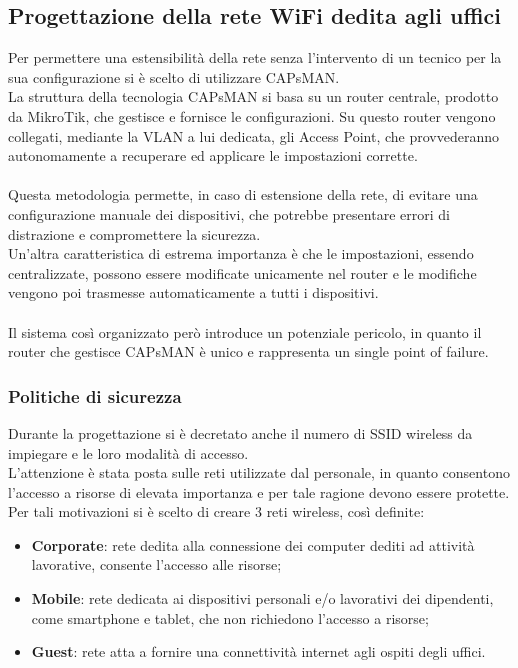 \documentclass[Realizzazione.tex]{subfiles}
\begin{document}
\subsection{Progettazione della rete WiFi dedita agli uffici}
Per permettere una estensibilità della rete senza l'intervento di un tecnico per la sua configurazione si è scelto di utilizzare CAPsMAN. \\
La struttura della tecnologia CAPsMAN si basa su un router centrale, prodotto da MikroTik, che gestisce e fornisce le configurazioni. Su questo router vengono collegati, mediante la VLAN a lui dedicata, gli Access Point, che provvederanno autonomamente a recuperare ed applicare le impostazioni corrette. \\\\
Questa metodologia permette, in caso di estensione della rete, di evitare una configurazione manuale dei dispositivi, che potrebbe presentare errori di distrazione e compromettere la sicurezza. \\
Un'altra caratteristica di estrema importanza è che le impostazioni, essendo centralizzate, possono essere modificate unicamente nel router e le modifiche vengono poi trasmesse automaticamente a tutti i dispositivi. \\\\
Il sistema così organizzato però introduce un potenziale pericolo, in quanto il router che gestisce CAPsMAN è unico e rappresenta un single point of failure.

\newpage
\subsubsection{Politiche di sicurezza}
Durante la progettazione si è decretato anche il numero di SSID wireless da impiegare e le loro modalità di accesso. \\
L'attenzione è stata posta sulle reti utilizzate dal personale, in quanto consentono l'accesso a risorse di elevata importanza e per tale ragione devono essere protette. \\
Per tali motivazioni si è scelto di creare 3 reti wireless, così definite:
\begin{itemize}
	\item \textbf{Corporate}: rete dedita alla connessione dei computer dediti ad attività lavorative, consente l'accesso alle risorse;
	\item \textbf{Mobile}: rete dedicata ai dispositivi personali e/o lavorativi dei dipendenti, come smartphone e tablet, che non richiedono l'accesso a risorse;
	\item \textbf{Guest}: rete atta a fornire una connettività internet agli ospiti degli uffici.
\end{itemize}
\end{document}
